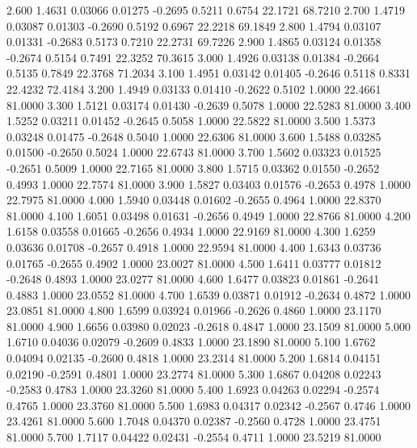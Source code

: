    2.600   1.4631   0.03066   0.01275  -0.2695   0.5211   0.6754  22.1721  68.7210
   2.700   1.4719   0.03087   0.01303  -0.2690   0.5192   0.6967  22.2218  69.1849
   2.800   1.4794   0.03107   0.01331  -0.2683   0.5173   0.7210  22.2731  69.7226
   2.900   1.4865   0.03124   0.01358  -0.2674   0.5154   0.7491  22.3252  70.3615
   3.000   1.4926   0.03138   0.01384  -0.2664   0.5135   0.7849  22.3768  71.2034
   3.100   1.4951   0.03142   0.01405  -0.2646   0.5118   0.8331  22.4232  72.4184
   3.200   1.4949   0.03133   0.01410  -0.2622   0.5102   1.0000  22.4661  81.0000
   3.300   1.5121   0.03174   0.01430  -0.2639   0.5078   1.0000  22.5283  81.0000
   3.400   1.5252   0.03211   0.01452  -0.2645   0.5058   1.0000  22.5822  81.0000
   3.500   1.5373   0.03248   0.01475  -0.2648   0.5040   1.0000  22.6306  81.0000
   3.600   1.5488   0.03285   0.01500  -0.2650   0.5024   1.0000  22.6743  81.0000
   3.700   1.5602   0.03323   0.01525  -0.2651   0.5009   1.0000  22.7165  81.0000
   3.800   1.5715   0.03362   0.01550  -0.2652   0.4993   1.0000  22.7574  81.0000
   3.900   1.5827   0.03403   0.01576  -0.2653   0.4978   1.0000  22.7975  81.0000
   4.000   1.5940   0.03448   0.01602  -0.2655   0.4964   1.0000  22.8370  81.0000
   4.100   1.6051   0.03498   0.01631  -0.2656   0.4949   1.0000  22.8766  81.0000
   4.200   1.6158   0.03558   0.01665  -0.2656   0.4934   1.0000  22.9169  81.0000
   4.300   1.6259   0.03636   0.01708  -0.2657   0.4918   1.0000  22.9594  81.0000
   4.400   1.6343   0.03736   0.01765  -0.2655   0.4902   1.0000  23.0027  81.0000
   4.500   1.6411   0.03777   0.01812  -0.2648   0.4893   1.0000  23.0277  81.0000
   4.600   1.6477   0.03823   0.01861  -0.2641   0.4883   1.0000  23.0552  81.0000
   4.700   1.6539   0.03871   0.01912  -0.2634   0.4872   1.0000  23.0851  81.0000
   4.800   1.6599   0.03924   0.01966  -0.2626   0.4860   1.0000  23.1170  81.0000
   4.900   1.6656   0.03980   0.02023  -0.2618   0.4847   1.0000  23.1509  81.0000
   5.000   1.6710   0.04036   0.02079  -0.2609   0.4833   1.0000  23.1890  81.0000
   5.100   1.6762   0.04094   0.02135  -0.2600   0.4818   1.0000  23.2314  81.0000
   5.200   1.6814   0.04151   0.02190  -0.2591   0.4801   1.0000  23.2774  81.0000
   5.300   1.6867   0.04208   0.02243  -0.2583   0.4783   1.0000  23.3260  81.0000
   5.400   1.6923   0.04263   0.02294  -0.2574   0.4765   1.0000  23.3760  81.0000
   5.500   1.6983   0.04317   0.02342  -0.2567   0.4746   1.0000  23.4261  81.0000
   5.600   1.7048   0.04370   0.02387  -0.2560   0.4728   1.0000  23.4751  81.0000
   5.700   1.7117   0.04422   0.02431  -0.2554   0.4711   1.0000  23.5219  81.0000
